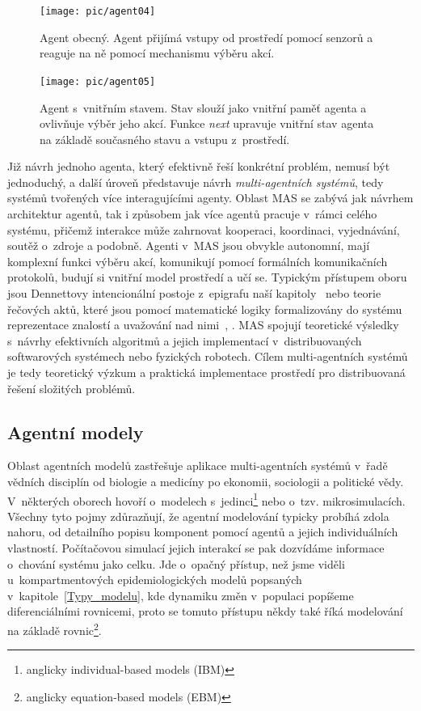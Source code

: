 \begin{figure}%
\centerline{%
\texttt{[image: pic/agent04]}%
}
\caption{Agent obecný. Agent přijímá vstupy od prostředí pomocí senzorů a reaguje na ně pomocí mechanismu výběru akcí.}%
\label{fig:agent}%
\end{figure}

\begin{figure}%
\centerline{%
\texttt{[image: pic/agent05]}%
}
\caption{Agent s~vnitřním stavem. Stav slouží jako vnitřní paměť agenta a ovlivňuje výběr jeho akcí. Funkce \emph{next} upravuje vnitřní stav agenta na základě současného stavu a vstupu z~prostředí.}%
\label{fig:agent-stav}%
\end{figure}

Již návrh jednoho agenta, který efektivně řeší konkrétní problém, nemusí být jednoduchý, a další úroveň představuje návrh \emph{multi-agentních systémů}, tedy systémů tvořených více interagujícími agenty.  
Oblast MAS se zabývá jak návrhem architektur agentů, tak i způsobem jak více agentů pracuje v~rámci celého systému, přičemž interakce může zahrnovat kooperaci, koordinaci, vyjednávání, soutěž o~zdroje a podobně. Agenti v~MAS jsou obvykle autonomní, mají komplexní funkci výběru akcí, komunikují pomocí formálních komunikačních protokolů, budují si vnitřní model prostředí a učí se. Typickým přístupem oboru jsou Dennettovy intencionální postoje z~epigrafu naší kapitoly~\cite{Dennett87} nebo teorie řečových aktů, které jsou pomocí matematické logiky formalizovány do systému reprezentace znalostí a uvažování nad nimi~\cite{Shoham93}, \cite{Cohen96}. MAS spojují teoretické výsledky s~návrhy efektivních algoritmů a jejich implementací v~distribuovaných softwarových systémech nebo fyzických robotech. Cílem multi-agentních systémů je tedy teoretický výzkum a praktická implementace prostředí pro distribuovaná řešení složitých problémů.  

\subsection*{Agentní modely}

Oblast agentních modelů zastřešuje aplikace multi-agentních systémů v~řadě vědních disciplín od biologie a medicíny po ekonomii, sociologii a politické vědy. V~některých oborech hovoří o~modelech s~jedinci\footnote{anglicky individual-based models (IBM)} nebo o~tzv. mikrosimulacích. 
Všechny tyto pojmy zdůrazňují, že agentní modelování typicky probíhá zdola nahoru, od detailního popisu komponent pomocí agentů a jejich individuálních vlastností.  Počítačovou simulací jejich interakcí se pak dozvídáme informace o~chování systému jako celku. Jde o~opačný přístup, než jsme viděli u~kompartmentových epidemiologických modelů popsaných v~kapitole~\ref{Typy_modelu}, kde dynamiku změn v~populaci popíšeme diferenciálními rovnicemi, proto se tomuto přístupu někdy  také říká modelování na základě rovnic\footnote{anglicky equation-based models (EBM)}. 

